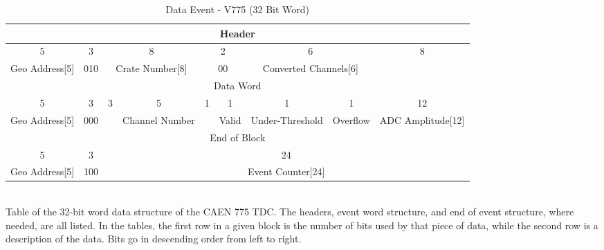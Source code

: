 \begin{landscape}
    \pagebreak
    
    \begin{table}[]
    \centering
    \caption{\label{tab:word_CAEN}Data Event - V775 (32 Bit Word)}
    \begin{tabular}{c|c|c|c|c|c|c|c|c|c|c|c|c|c|c|c|c|c|c|c|c|c|c|c|c|c|c|c|c|c|c|c}
        \toprule
        \multicolumn{32}{c}{Header} \\
        \hline
        \multicolumn{5}{c|}{5} & \multicolumn{3}{|c|}{3} & \multicolumn{8}{|c|}{8} & \multicolumn{2}{|c|}{2} & \multicolumn{6}{|c|}{6} & \multicolumn{8}{|c}{8} \\
        \hline
        \multicolumn{5}{c|}{Geo Address[5]} & \multicolumn{3}{|c|}{010} & \multicolumn{8}{|c|}{Crate Number[8]} & \multicolumn{2}{|c|}{00} & \multicolumn{6}{|c|}{Converted Channels[6]} & \multicolumn{8}{|c}{} \\
        \midrule
        \multicolumn{32}{c}{Data Word} \\
        \hline
        \multicolumn{5}{c|}{5} & \multicolumn{3}{|c|}{3} & \multicolumn{3}{|c|}{3} & \multicolumn{5}{|c|}{5} & 1 & 1 & 1 & 1 & \multicolumn{12}{|c}{12}\\
        \hline
        \multicolumn{5}{c|}{Geo Address[5]} & \multicolumn{3}{|c|}{000} & \multicolumn{3}{|c|}{} & \multicolumn{5}{|c|}{Channel Number} &  & Valid & Under-Threshold & Overflow & \multicolumn{12}{|c}{ADC Amplitude[12]}\\
        \midrule
        \multicolumn{32}{c}{End of Block} \\
        \hline
        \multicolumn{5}{c|}{5} & \multicolumn{3}{|c|}{3} & \multicolumn{24}{|c}{24} \\
        \hline
        \multicolumn{5}{c|}{Geo Address[5]} & \multicolumn{3}{|c|}{100} & \multicolumn{24}{|c}{Event Counter[24]} \\
        \bottomrule
    \end{tabular}
    \\[2pt]
    \footnotesize
    Table of the 32-bit word data structure of the CAEN 775 TDC. The headers, event word structure, and end of event structure, where needed, are all listed. In the tables, the first row in a given block is the number of bits used by that piece of data, while the second row is a description of the data. Bits go in descending order from left to right.
    \end{table}

    \pagebreak
    

\end{landscape}
